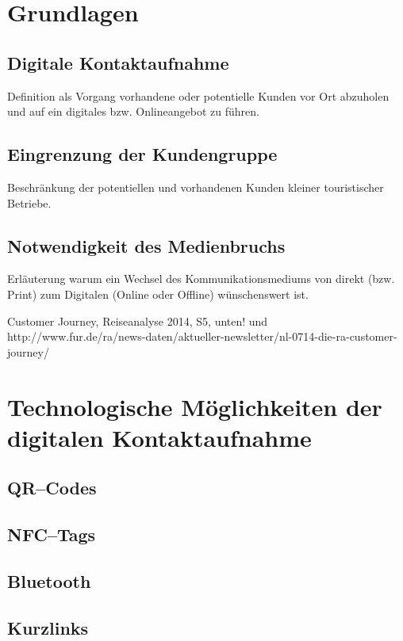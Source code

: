 \section{Grundlagen}
\label{sec:grundlagen}

\subsection{Digitale Kontaktaufnahme}

Definition als Vorgang vorhandene oder potentielle
Kunden vor Ort abzuholen und auf ein digitales bzw. Onlineangebot zu
führen.

\subsection{Eingrenzung der Kundengruppe}

Beschränkung der potentiellen und vorhandenen Kunden kleiner touristischer Betriebe.

\subsection{Notwendigkeit des Medienbruchs}

Erläuterung warum ein Wechsel des Kommunikationsmediums von direkt (bzw. Print) zum Digitalen (Online oder Offline) wünschenswert ist.

Customer Journey, Reiseanalyse 2014, S5, unten! und http://www.fur.de/ra/news-daten/aktueller-newsletter/nl-0714-die-ra-customer-journey/ 

\section{Technologische Möglichkeiten der digitalen Kontaktaufnahme}
\label{sec:technologien}

\subsection{QR–Codes}
\subsection{NFC--Tags}
\subsection{Bluetooth}
\subsection{Kurzlinks}
